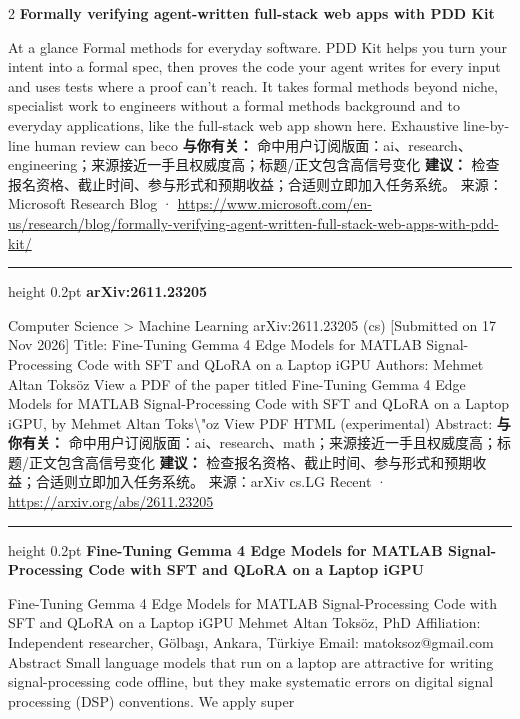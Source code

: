 \documentclass[10.5pt]{ctexart}
\begin{document}
\begin{multicols}{2}
{\large\bfseries Formally verifying agent-written full-stack web apps with PDD Kit}\par
At a glance Formal methods for everyday software. PDD Kit helps you turn your intent into a formal spec, then proves the code your agent writes for every input and uses tests where a proof can’t reach. It takes formal methods beyond niche, specialist work to engineers without a formal methods background and to everyday applications, like the full-stack web app shown here. Exhaustive line-by-line human review can beco
\textbf{与你有关：} 命中用户订阅版面：ai、research、engineering；来源接近一手且权威度高；标题/正文包含高信号变化
\textbf{建议：} 检查报名资格、截止时间、参与形式和预期收益；合适则立即加入任务系统。
{\footnotesize\color{ormuted} 来源：Microsoft Research Blog · \url{https://www.microsoft.com/en-us/research/blog/formally-verifying-agent-written-full-stack-web-apps-with-pdd-kit/}}
\vspace{2mm}
\hrule height 0.2pt
\vspace{2mm}
{\large\bfseries arXiv:2611.23205}\par
Computer Science > Machine Learning arXiv:2611.23205 (cs) [Submitted on 17 Nov 2026] Title: Fine-Tuning Gemma 4 Edge Models for MATLAB Signal-Processing Code with SFT and QLoRA on a Laptop iGPU Authors: Mehmet Altan Toksöz View a PDF of the paper titled Fine-Tuning Gemma 4 Edge Models for MATLAB Signal-Processing Code with SFT and QLoRA on a Laptop iGPU, by Mehmet Altan Toks\textbackslash{}"oz View PDF HTML (experimental) Abstract:
\textbf{与你有关：} 命中用户订阅版面：ai、research、math；来源接近一手且权威度高；标题/正文包含高信号变化
\textbf{建议：} 检查报名资格、截止时间、参与形式和预期收益；合适则立即加入任务系统。
{\footnotesize\color{ormuted} 来源：arXiv cs.LG Recent · \url{https://arxiv.org/abs/2611.23205}}
\vspace{2mm}
\hrule height 0.2pt
\vspace{2mm}
{\large\bfseries Fine-Tuning Gemma 4 Edge Models for MATLAB Signal-Processing Code with SFT and QLoRA on a Laptop iGPU}\par
Fine-Tuning Gemma 4 Edge Models for MATLAB Signal-Processing Code with SFT and QLoRA on a Laptop iGPU Mehmet Altan Toksöz, PhD Affiliation: Independent researcher, Gölbaşı, Ankara, Türkiye Email: matoksoz@gmail.com Abstract Small language models that run on a laptop are attractive for writing signal-processing code offline, but they make systematic errors on digital signal processing (DSP) conventions. We apply super

\end{multicols}
\end{document}
